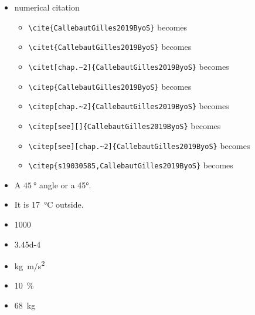 \begin{itemize}
\begin{itemize}
        
        \item \verb!\cref{fig:example}! becomes \cref{fig:example}
        \item \verb!\cref{tab:example}! becomes \cref{tab:example}
        \item \verb!\cref{ch:introduction}! becomes \cref{ch:introduction}
        \item \cref{eq:emc2}
        
        
    \end{itemize}
    \item numerical citation~\cite{s19030585}
    \begin{itemize}
    \item \verb!\cite{CallebautGilles2019ByoS}! becomes \cite{CallebautGilles2019ByoS}
    
        \item \verb!\citet{CallebautGilles2019ByoS}! becomes \citet{CallebautGilles2019ByoS}
        
        \item \verb!\citet[chap.~2]{CallebautGilles2019ByoS}! becomes \citet[chap.~2]{CallebautGilles2019ByoS}
        \item \verb!\citep{CallebautGilles2019ByoS}! becomes \citep{CallebautGilles2019ByoS}
        \item \verb!\citep[chap.~2]{CallebautGilles2019ByoS}! becomes \citep[chap.~2]{CallebautGilles2019ByoS}
        \item \verb!\citep[see][]{CallebautGilles2019ByoS}! becomes \citep[see][]{CallebautGilles2019ByoS}
        \item \verb!\citep[see][chap.~2]{CallebautGilles2019ByoS}!
becomes \citep[see][chap.~2]{CallebautGilles2019ByoS}       
\item \verb!\citep{s19030585,CallebautGilles2019ByoS}! becomes \citep{s19030585,CallebautGilles2019ByoS}
    \end{itemize}
    \item A $\SI{45}{\degree}$ angle or a \ang{45}.

\item It is \SI{17}{\degreeCelsius} outside.

\item  \num{1000}
\item \num{3.45d-4}


\item \si{kg.m/s^2} %

\item \SI{10}{\percent}
\item \SI{68}{kg}
\end{itemize}


